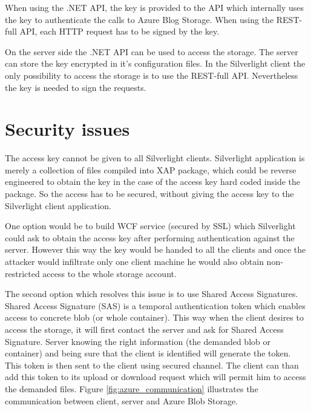 When using the .NET API, the key is provided to the API which internally uses the key to authenticate the calls to Azure Blog Storage. When using the REST-full API, each HTTP request has to be signed by the key.

On the server side the .NET API can be used to access the storage. The server can store the key encrypted in it's configuration files. In the Silverlight client the only possibility to access the storage is to use the REST-full API. Nevertheless the key is needed to sign the requests.

\section{Security issues}
The access key cannot be given to all Silverlight clients. Silverlight application is merely a collection of files compiled into XAP package, which could be reverse engineered to obtain the key in the case of the access key hard coded inside the package. So the access has to be secured, without giving the access key to the Silverlight client application.

One option would be to build WCF service (secured by SSL) which Silverlight could ask to obtain the access key after performing authentication against the server. However this way the key would be handed to all the clients and once the attacker would infiltrate only one client machine he would also obtain non-restricted access to the whole storage account.

The second option which resolves this issue is to use Shared Access Signatures. Shared Access Signature (SAS) is a temporal authentication token which enables access to concrete blob (or whole container). This way when the client desires to access the storage, it will first contact the server and ask for Shared Access Signature. Server knowing the right information (the demanded blob or container) and being sure that the client is identified will generate the token. This token is then sent to the client using secured channel. The client can than add this token to its upload or download request which will permit him to access the demanded files. Figure \ref{fig:azure_communication} illustrates the communication between client, server and Azure Blob Storage.

